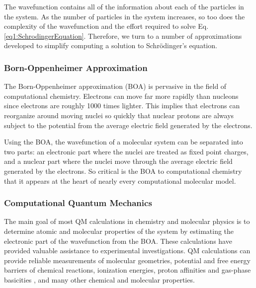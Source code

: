 The wavefunction contains all of the information about each of the particles in
the system. As the number of particles in the system increases, so too does the
complexity of the wavefunction and the effort required to solve Eq.
\ref{eq1:SchrodingerEquation}. Therefore, we turn to a number of approximations
developed to simplify computing a solution to Schr\"odinger's equation.

\subsubsection{Born-Oppenheimer Approximation}

The Born-Oppenheimer approximation (BOA) is pervasive in the field of
computational chemistry. Electrons can move far more rapidly than nucleons since
electrons are roughly 1000 times lighter. This implies that electrons can
reorganize around moving nuclei so quickly that nuclear protons are always
subject to the potential from the average electric field generated by the
electrons.

Using the BOA, the wavefunction of a molecular system can be separated into two
parts: an electronic part where the nuclei are treated as fixed point charges,
and a nuclear part where the nuclei move through the average electric field
generated by the electrons.  \cite{McQuarrie_Book_PhysChem_1997} So critical is
the BOA to computational chemistry that it appears at the heart of nearly every
computational molecular model.

\subsubsection{Computational Quantum Mechanics}
\label{sec1:CompQuantumMech}

The main goal of most QM calculations in chemistry and molecular physics is to
determine atomic and molecular properties of the system by estimating the
electronic part of the wavefunction from the BOA. These calculations have
provided valuable assistance to experimental investigations. QM calculations
can provide reliable measurements of molecular geometries,
\cite{Jeletic_JOrganometChem_2011_v696_p3127} potential and free energy barriers
of chemical reactions, \cite{Chandrasekhar_JAmChemSoc_1985_v107_p154} ionization
energies, \cite{Watson_ChemPhysLett_2013_v555_p235} proton affinities and
gas-phase basicities \cite{Range_PhysChemChemPhys_2005_v7_p3070}, and many other
chemical and molecular properties. \cite{Hehre_Ab_inito_MO_Theory_Book_1986}

